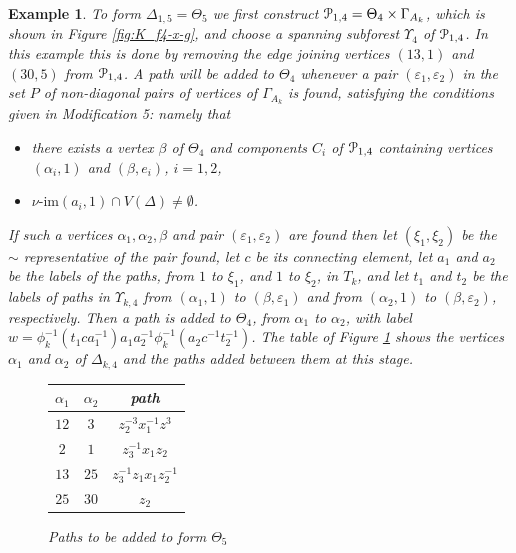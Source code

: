 \documentclass[a4paper,12pt]{article}
\renewcommand{\a}{\alpha }
\renewcommand{\b}{\beta }
\newcommand{\G}{\Gamma }
\newcommand{\D}{\Delta }
\newcommand{\e}{\varepsilon }
\newcommand{\T}{\Theta }
\newcommand{\U}{\Upsilon }
\newcommand{\cP}{{\cal{P}}}
\newcommand{\vim}{\nu\textrm{-im}}
\newtheorem{exam}[theorem]{Example}
\newenvironment{example}{\begin{exam} \rm}{\end{exam}}
\numberwithin{equation}{section}
\numberwithin{figure}{section}
\begin{document}
\begin{example}
To form $\D_{1,5}=\T_5$ we first construct $\cP_{1,4}=\T_4\times \G_{A_k}$,
which is shown in Figure \ref{fig:K_f4-x-g}, and choose a spanning
subforest $\U_4$ of $\cP_{1,4}$. In this example this is done by
removing the edge  joining vertices $(13,1)$ and $(30,5)$ from
$\cP_{1,4}$. A path will be added to $\T_4$ whenever a pair $(\e_1,\e_2)$
in the set $P$ of non-diagonal pairs of vertices of $\G_{A_k}$ is
found, satisfying the conditions given in Modification 5: namely
that
\begin{itemize}
\item
there exists a vertex $\b$ of $\T_4$ and  
components $C_i$ of $\cP_{1,4}$ containing vertices
$(\a_i,1)$ and $(\b, e_i)$, $i=1,2$, 
\item $\vim(a_i,1)\cap V(\D)\neq \emptyset$.
\end{itemize}
If such a vertices $\a_1,\a_2,\b$ and pair $(\e_1,\e_2)$ are found then 
let $(\xi_1,\xi_2)$ be the  $\sim$ representative of the pair found, let
$c$ be its connecting element, let $a_1$ and $a_2$ be the labels of  the paths, from
$1$ to $\xi_1$, and $1$ to $\xi_2$, in $T_k$, and let $t_1$ and $t_2$ be
the labels of paths in $\U_{k,4}$ from $(\a_1,1)$ to $(\b,\e_1)$ and 
from $(\a_2,1)$ to $(\b,\e_2)$, respectively. 
 Then a path is 
added to
$\T_4$, from $\a_1$ to $\a_2$, with label  $w=\phi_k^{-1}(t_1ca_1^{-1})a_1a_2^{-1}\phi_k^{-1}(a_2c^{-1}t_2^{-1})$.
The table of Figure \ref{tab:T5} shows the vertices $\a_1$ and 
$\a_2$ of $\D_{k,4}$ and the paths added between them at this stage. 
\begin{figure}
\begin{center}
\renewcommand{\arraystretch}{1.5}
\begin{tabular}{|c|c|c|}
\hline
$\a_1$& $\a_2$& path \\\hline\hline
$12$ &$3$ & $z_2^{-3}x_1^{-1}z^3$\\\hline
 $2$ & $1$ & $z_3^{-1}x_1z_2$ \\\hline
 $13$ & $25$ & $z_3^{-1}z_1x_1z_2^{-1}$ \\\hline
$25$ & $30$ & $z_2$\\ \hline
\end{tabular}
\renewcommand{\arraystretch}{1}
\end{center}
\caption{Paths to be added to form $\T_5$}
\label{tab:T5}
\end{figure}


\end{example}
\end{document}
